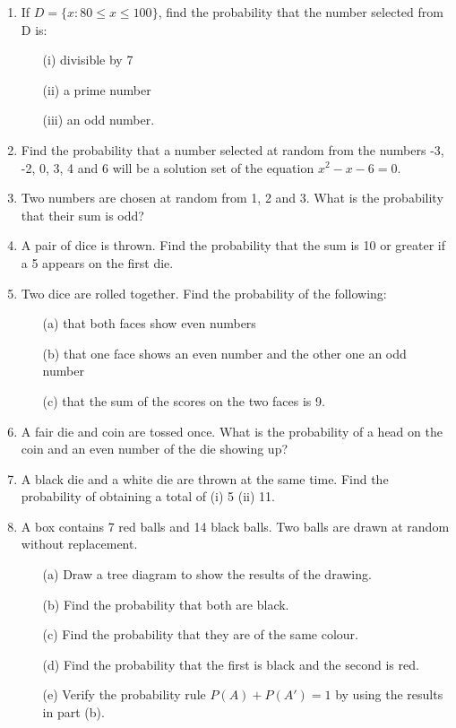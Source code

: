 \begin{enumerate}
	\item If $D = \{x: 80\leq x \leq 100\}$, find the probability that the number selected from D is:
	\begin{itemize}
	\item[(i)] divisible by 7
	\item[(ii)] a prime number
	\item[(iii)] an odd number.
	\end{itemize}
			
	\item Find the probability that a number selected at random from the numbers -3, -2, 0, 3, 4 and 6 will be a solution set of the equation $x^2 - x - 6 = 0$.
	
	
	\item Two numbers are chosen at random from 1, 2 and 3. What is the probability that their sum is odd?
	
	\item A pair of dice is thrown. Find the probability that the sum is 10 or greater if a 5 appears on the first die.
	
	\item Two dice are rolled together. Find the probability of the following:
		\begin{itemize}
		\item[(a)] that both faces show even numbers
		\item[(b)] that one face shows an even number and the other one an odd number
		\item[(c)] that the sum of the scores on the two faces is 9.
		\end{itemize}
	
	\item A fair die and coin are tossed once. What is the probability of a head on the coin and an even number of the die showing up?
			
	\item A black die and a white die are thrown at the same time. Find the probability of obtaining a total of (i) 5 (ii) 11.
	
	\item A box contains 7 red balls and 14 black balls. Two balls are drawn at random without replacement.
		\begin{itemize}
		\item[(a)] Draw a tree diagram to show the results of the drawing.
		\item[(b)] Find the probability that both are black.
		\item[(c)] Find the probability that they are of the same colour.
		\item[(d)] Find the probability that the first is black and the second is red.
		\item[(e)] Verify the probability rule $P(A) + P(A') = 1$ by using the results in part (b).
		\end{itemize}
	

\end{enumerate}

